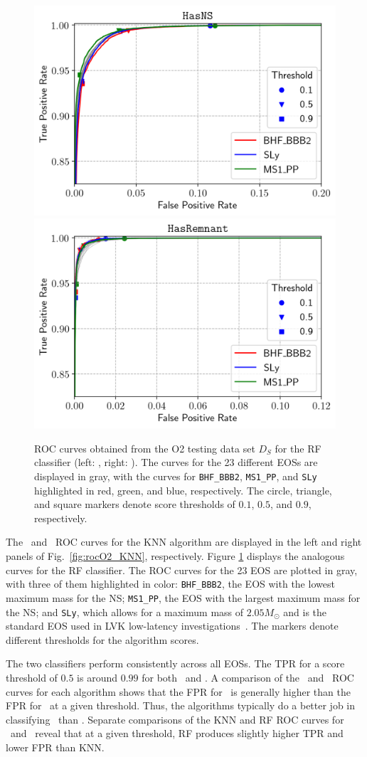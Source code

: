 \begin{figure}%
\includegraphics[width=0.45\linewidth]{roc_testing_RF_NS}
\includegraphics[width=0.45\linewidth]{roc_testing_RF_REM}
\caption{\ac{ROC} curves obtained from the \ac{O2} testing data set $D_S$ for the \ac{RF} classifier (left: \hasns, right: \hasrem). The curves for the 23 different \ac{EOS}s are displayed in
gray, with the curves for {\tt BHF\_BBB2}, {\tt MS1\_PP}, and {\tt SLy} highlighted in red, green, and blue, respectively. The circle, triangle, and square markers denote score thresholds of
$0.1$, $0.5$, and $0.9$, respectively.}
\label{fig:rocO2_RF}
\end{figure}

The \hasns\ and \hasrem\ \ac{ROC} curves for the  \ac{KNN} algorithm are displayed in the left and right panels of Fig.~\ref{fig:rocO2_KNN}, respectively. Figure \ref{fig:rocO2_RF}
displays the analogous curves for the \ac{RF} classifier. The \ac{ROC} curves for the 23 \ac{EOS} are plotted in gray, with three of them highlighted in color: {\tt BHF\_BBB2}, the
\ac{EOS} with the lowest maximum mass for the NS; {\tt MS1\_PP}, the \ac{EOS} with the largest maximum mass for the \ac{NS}; and {\tt SLy}, which allows for a maximum mass of $2.05
M_\odot$ and is the standard \ac{EOS} used in \ac{LVK} low-latency investigations~\cite{Ghosh:2021eqv}. The markers denote different thresholds for the algorithm scores. 

The two classifiers perform consistently across all \ac{EOS}s. The \ac{TPR} for a score threshold of $0.5$ is around $0.99$ for both \hasns\ and \hasrem. A comparison of the \hasns\ and
\hasrem\ \ac{ROC} curves for each algorithm shows that the \ac{FPR} for \hasns\ is generally higher than the \ac{FPR} for \hasrem\ at a given threshold. Thus, the algorithms typically do
a better job in classifying \hasrem\ than \hasns. Separate comparisons of the \ac{KNN} and \ac{RF} \ac{ROC} curves for \hasns\ and \hasrem\ reveal that at a given threshold, \ac{RF}
produces slightly higher \ac{TPR} and lower \ac{FPR} than \ac{KNN}.

